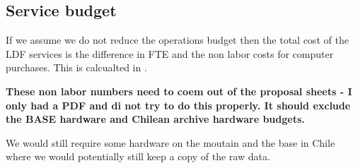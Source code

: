 \subsection{Service budget}

If we assume we do not reduce the operations budget then the total cost of the \gls{LDF} services is
the difference in \gls{FTE} and the non labor costs for computer purchases.
This is calcualted in  .



\textbf{ These non labor numbers need to coem out of the proposal sheets - I only had a \gls{PDF} and di not try to do this properly. It should exclude the BASE hardware and Chilean archive hardware budgets.}


We would still require some hardware on the moutain and the base in Chile where we would potentially still keep a copy of the raw data.

